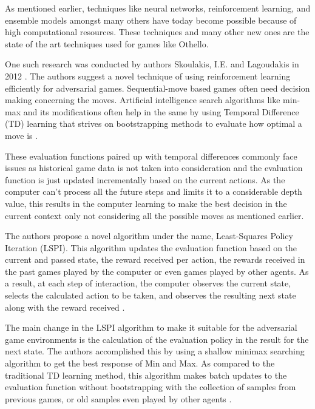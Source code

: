 \documentclass{svproc}
\begin{document}
As mentioned earlier, techniques like neural networks, reinforcement learning, and ensemble models amongst many others have today become possible because of high computational resources. These techniques and many other new ones are the state of the art techniques used for games like Othello.

One such research was conducted by authors Skoulakis, I.E. and Lagoudakis in 2012 \cite{esmond_1}. The authors suggest a novel technique of using reinforcement learning efficiently for adversarial games. Sequential-move based games often need decision making concerning the moves. Artificial intelligence search algorithms like min-max and its modifications often help in the same by using Temporal Difference (TD) learning that strives on bootstrapping methods to evaluate how optimal a move is \cite{esmond_1}.

These evaluation functions paired up with temporal differences commonly face issues as historical game data is not taken into consideration and the evaluation function is just updated incrementally based on the current actions. As the computer can't process all the future steps and limits it to a considerable depth value, this results in the computer learning to make the best decision in the current context only not considering all the possible moves as mentioned earlier.

The authors propose a novel algorithm under the name, Least-Squares Policy Iteration (LSPI). This algorithm updates the evaluation function based on the current and passed state, the reward received per action, the rewards received in the past games played by the computer or even games played by other agents. As a result, at each step of interaction, the computer observes the current state, selects the calculated action to be taken, and observes the resulting next state along with the reward received \cite{esmond_1}.

The main change in the LSPI algorithm to make it suitable for the adversarial game environments is the calculation of the evaluation policy in the result for the next state. The authors accomplished this by using a shallow minimax searching algorithm to get the best response of Min and Max. As compared to the traditional TD learning method, this algorithm makes batch updates to the evaluation function without bootstrapping with the collection of samples from previous games, or old samples even played by other agents \cite{esmond_1}.
\end{document}
